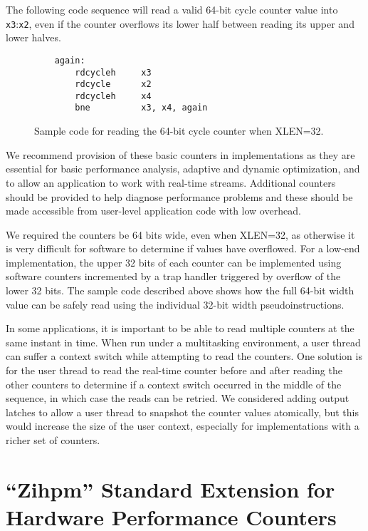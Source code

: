The following code sequence will read a valid 64-bit cycle counter value into
{\tt x3}:{\tt x2}, even if the counter overflows its lower half between reading its upper
and lower halves.

\begin{figure}[h!]
\begin{center}
\begin{verbatim}
    again:
        rdcycleh     x3
        rdcycle      x2
        rdcycleh     x4
        bne          x3, x4, again
\end{verbatim}
\end{center}
\caption{Sample code for reading the 64-bit cycle counter when XLEN=32.}
\label{rdcycle}
\end{figure}

\begin{commentary}
We recommend provision of these basic counters in implementations
as they are essential for basic performance analysis, adaptive and
dynamic optimization, and to allow an application to work with
real-time streams.  Additional counters should be provided to help
diagnose performance problems and these should be made accessible from
user-level application code with low overhead.

We required the counters be 64 bits wide, even when XLEN=32, as otherwise
it is very difficult for software to determine if values have
overflowed.  For a low-end implementation, the upper 32 bits of each
counter can be implemented using software counters incremented by a
trap handler triggered by overflow of the lower 32 bits.  The sample
code described above shows how the full 64-bit width value can be
safely read using the individual 32-bit width pseudoinstructions.

In some applications, it is important to be able to read multiple
counters at the same instant in time.  When run under a multitasking
environment, a user thread can suffer a context switch while
attempting to read the counters.  One solution is for the user thread
to read the real-time counter before and after reading the other
counters to determine if a context switch occurred in the middle of the
sequence, in which case the reads can be retried.  We considered
adding output latches to allow a user thread to snapshot the counter
values atomically, but this would increase the size of the user
context, especially for implementations with a richer set of counters.
\end{commentary}

\section{``Zihpm'' Standard Extension for Hardware Performance Counters}

